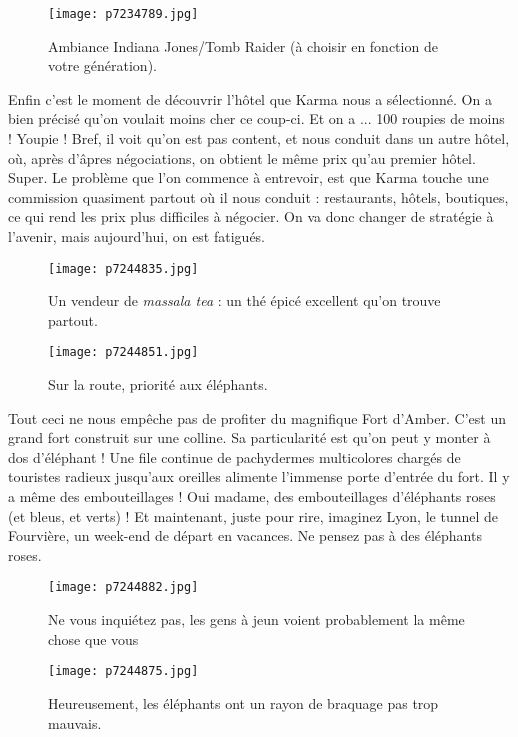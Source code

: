 \documentclass{book}
\begin{document}
\begin{figure}[h]
\centering
\texttt{[image: p7234789.jpg]}
\caption*{Ambiance Indiana Jones/Tomb Raider (à choisir en fonction de votre génération).}
\end{figure}

Enfin c'est le moment de découvrir l'hôtel que Karma nous a sélectionné. On a bien précisé qu'on voulait moins cher ce coup-ci. Et on a ... 100 roupies de moins ! Youpie ! Bref, il voit qu'on est pas content, et nous conduit dans un autre hôtel, où, après d'âpres négociations, on obtient le même prix qu'au premier hôtel. Super. Le problème que l'on commence à entrevoir, est que Karma touche une commission quasiment partout où il nous conduit : restaurants, hôtels, boutiques, ce qui rend les prix plus difficiles à négocier. On va donc changer de stratégie à l'avenir, mais aujourd'hui, on est fatigués.


\begin{figure}[h]
\centering
\texttt{[image: p7244835.jpg]}
\caption*{Un vendeur de \emph{massala tea} : un thé épicé excellent qu'on trouve partout.}
\end{figure}


\begin{figure}[h]
\centering
\texttt{[image: p7244851.jpg]}
\caption*{Sur la route, priorité aux éléphants.}
\end{figure}

Tout ceci ne nous empêche pas de profiter du magnifique Fort d'Amber. C'est un grand fort construit sur une colline. Sa particularité est qu'on peut y monter à dos d'éléphant ! Une file continue de pachydermes multicolores chargés de touristes radieux jusqu'aux oreilles alimente l'immense porte d'entrée du fort. Il y a même des embouteillages ! Oui madame, des embouteillages d'éléphants roses (et bleus, et verts) ! Et maintenant, juste pour rire, imaginez Lyon, le tunnel de Fourvière, un week-end de départ en vacances. Ne pensez pas à des éléphants roses.


\begin{figure}[h]
\centering
\texttt{[image: p7244882.jpg]}
\caption*{Ne vous inquiétez pas, les gens à jeun voient probablement la même chose que vous}
\end{figure}


\begin{figure}[h]
\centering
\texttt{[image: p7244875.jpg]}
\caption*{Heureusement, les éléphants ont un rayon de braquage pas trop mauvais.}
\end{figure}
\end{document}
